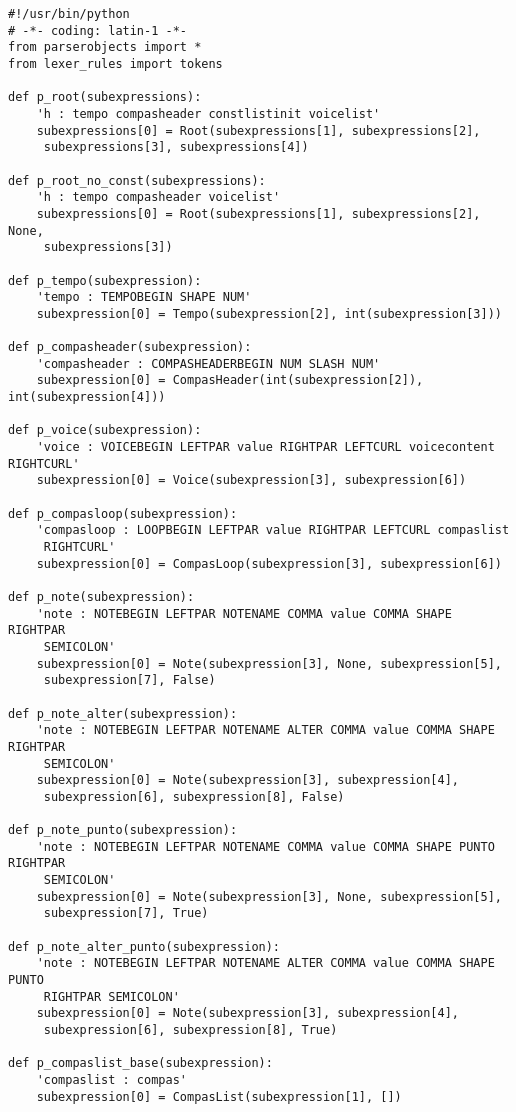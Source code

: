 \begin{verbatim}
#!/usr/bin/python
# -*- coding: latin-1 -*-
from parserobjects import *
from lexer_rules import tokens

def p_root(subexpressions):
    'h : tempo compasheader constlistinit voicelist'
    subexpressions[0] = Root(subexpressions[1], subexpressions[2],
     subexpressions[3], subexpressions[4])

def p_root_no_const(subexpressions):
    'h : tempo compasheader voicelist'
    subexpressions[0] = Root(subexpressions[1], subexpressions[2], None,
     subexpressions[3])

def p_tempo(subexpression):
    'tempo : TEMPOBEGIN SHAPE NUM'
    subexpression[0] = Tempo(subexpression[2], int(subexpression[3]))

def p_compasheader(subexpression):
    'compasheader : COMPASHEADERBEGIN NUM SLASH NUM'
    subexpression[0] = CompasHeader(int(subexpression[2]), int(subexpression[4]))

def p_voice(subexpression):
    'voice : VOICEBEGIN LEFTPAR value RIGHTPAR LEFTCURL voicecontent RIGHTCURL'
    subexpression[0] = Voice(subexpression[3], subexpression[6])

def p_compasloop(subexpression):
    'compasloop : LOOPBEGIN LEFTPAR value RIGHTPAR LEFTCURL compaslist
     RIGHTCURL'
    subexpression[0] = CompasLoop(subexpression[3], subexpression[6])

def p_note(subexpression):
    'note : NOTEBEGIN LEFTPAR NOTENAME COMMA value COMMA SHAPE RIGHTPAR
     SEMICOLON'
    subexpression[0] = Note(subexpression[3], None, subexpression[5],
     subexpression[7], False)

def p_note_alter(subexpression):
    'note : NOTEBEGIN LEFTPAR NOTENAME ALTER COMMA value COMMA SHAPE RIGHTPAR
     SEMICOLON'
    subexpression[0] = Note(subexpression[3], subexpression[4],
     subexpression[6], subexpression[8], False)

def p_note_punto(subexpression):
    'note : NOTEBEGIN LEFTPAR NOTENAME COMMA value COMMA SHAPE PUNTO RIGHTPAR
     SEMICOLON'
    subexpression[0] = Note(subexpression[3], None, subexpression[5],
     subexpression[7], True)

def p_note_alter_punto(subexpression):
    'note : NOTEBEGIN LEFTPAR NOTENAME ALTER COMMA value COMMA SHAPE PUNTO
     RIGHTPAR SEMICOLON'
    subexpression[0] = Note(subexpression[3], subexpression[4],
     subexpression[6], subexpression[8], True)

def p_compaslist_base(subexpression):
    'compaslist : compas'
    subexpression[0] = CompasList(subexpression[1], [])


\end{verbatim}
